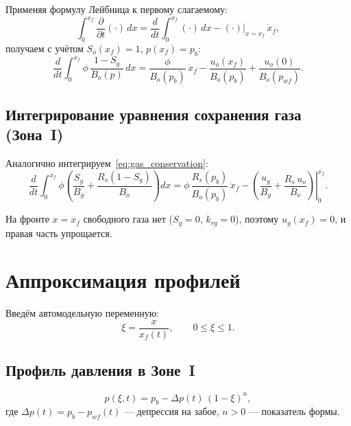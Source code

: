 \documentclass[12pt,a4paper]{article}
\begin{document}
Применяя формулу Лейбница к первому слагаемому:
\begin{equation}\label{eq:leibniz}
  \int_0^{x_f}\frac{\partial}{\partial t}(\cdot)\,dx
  = \frac{d}{dt}\int_0^{x_f}(\cdot)\,dx
  - (\cdot)\big|_{x=x_f}\,\dot{x}_f,
\end{equation}
получаем с учётом $S_o(x_f) = 1$, $p(x_f) = p_b$:
\begin{equation}\label{eq:oil_integral}
  \boxed{
  \frac{d}{dt}\int_0^{x_f} \phi\,\frac{1 - S_g}{B_o(p)}\,dx
  = \frac{\phi}{B_o(p_b)}\,\dot{x}_f
  - \frac{u_o(x_f)}{B_o(p_b)}
  + \frac{u_o(0)}{B_o(p_{wf})}.
  }
\end{equation}

\subsection{Интегрирование уравнения сохранения газа (Зона~I)}

Аналогично интегрируем~\eqref{eq:gas_conservation}:
\begin{equation}\label{eq:gas_integral}
  \boxed{
  \frac{d}{dt}\int_0^{x_f} \phi\left(\frac{S_g}{B_g}
  + \frac{R_s(1-S_g)}{B_o}\right)dx
  = \phi\,\frac{R_s(p_b)}{B_o(p_b)}\,\dot{x}_f
  - \left.\left(\frac{u_g}{B_g}+\frac{R_s\,u_o}{B_o}\right)\right|_0^{x_f}.
  }
\end{equation}

На фронте $x = x_f$ свободного газа нет ($S_g = 0$, $k_{rg} = 0$), поэтому
$u_g(x_f) = 0$, и правая часть упрощается.

\section{Аппроксимация профилей}

Введём автомодельную переменную:
\begin{equation}\label{eq:xi}
  \xi = \frac{x}{x_f(t)}, \qquad 0 \le \xi \le 1.
\end{equation}

\subsection{Профиль давления в Зоне~I}

\begin{equation}\label{eq:pressure_profile}
  p(\xi, t) = p_b - \Delta p(t)\,(1-\xi)^n,
\end{equation}
где $\Delta p(t) = p_b - p_{wf}(t)$ --- депрессия на забое,
$n > 0$ --- показатель формы.
\end{document}
